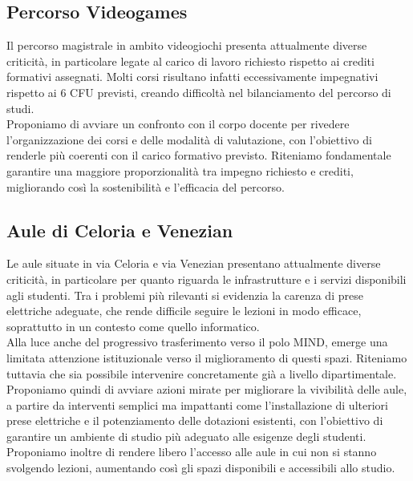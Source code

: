 \documentclass[12pt,a4paper]{article}
\begin{document}
\subsection{Percorso Videogames}
Il percorso magistrale in ambito videogiochi presenta attualmente diverse criticità, in particolare legate al carico di lavoro richiesto rispetto ai crediti formativi assegnati. Molti corsi risultano infatti eccessivamente impegnativi rispetto ai 6 CFU previsti, creando difficoltà nel bilanciamento del percorso di studi.
\\Proponiamo di avviare un confronto con il corpo docente per rivedere l’organizzazione dei corsi e delle modalità di valutazione, con l’obiettivo di renderle più coerenti con il carico formativo previsto. Riteniamo fondamentale garantire una maggiore proporzionalità tra impegno richiesto e crediti, migliorando così la sostenibilità e l’efficacia del percorso.

\subsection{Aule di Celoria e Venezian}
Le aule situate in via Celoria e via Venezian presentano attualmente diverse criticità, in particolare per quanto riguarda le infrastrutture e i servizi disponibili agli studenti. Tra i problemi più rilevanti si evidenzia la carenza di prese elettriche adeguate, che rende difficile seguire le lezioni in modo efficace, soprattutto in un contesto come quello informatico.
\\Alla luce anche del progressivo trasferimento verso il polo MIND, emerge una limitata attenzione istituzionale verso il miglioramento di questi spazi. Riteniamo tuttavia che sia possibile intervenire concretamente già a livello dipartimentale.
\\Proponiamo quindi di avviare azioni mirate per migliorare la vivibilità delle aule, a partire da interventi semplici ma impattanti come l’installazione di ulteriori prese elettriche e il potenziamento delle dotazioni esistenti, con l’obiettivo di garantire un ambiente di studio più adeguato alle esigenze degli studenti.\\Proponiamo inoltre di rendere libero l'accesso alle aule in cui non si stanno svolgendo lezioni, aumentando così gli spazi disponibili e accessibili allo studio.
\end{document}
